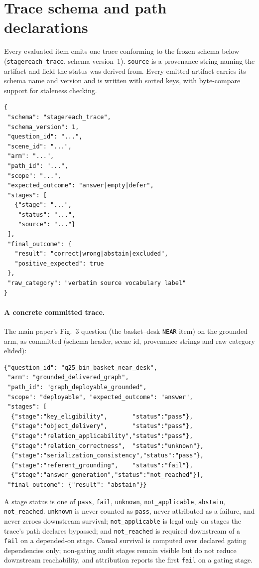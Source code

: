 \section{Trace schema and path declarations}
\label{ssec:schema}

Every evaluated item emits one trace conforming to the frozen schema below
(\texttt{stagereach\_trace}, schema version~1). \texttt{source} is a
provenance string naming the artifact and field the status was derived from.
Every emitted artifact carries its schema name and version and is written
with sorted keys, with byte-compare support for staleness checking.

\begin{center}
\footnotesize
\begin{verbatim}
{
 "schema": "stagereach_trace",
 "schema_version": 1,
 "question_id": "...",
 "scene_id": "...",
 "arm": "...",
 "path_id": "...",
 "scope": "...",
 "expected_outcome": "answer|empty|defer",
 "stages": [
   {"stage": "...",
    "status": "...",
    "source": "..."}
 ],
 "final_outcome": {
   "result": "correct|wrong|abstain|excluded",
   "positive_expected": true
 },
 "raw_category": "verbatim source vocabulary label"
}
\end{verbatim}
\end{center}

\paragraph{A concrete committed trace.} The main paper's Fig.~3 question
(the basket--desk \texttt{NEAR} item) on the grounded arm, as committed
(schema header, scene id, provenance strings and raw category elided):
{\scriptsize
\begin{verbatim}
{"question_id": "q25_bin_basket_near_desk",
 "arm": "grounded_delivered_graph",
 "path_id": "graph_deployable_grounded",
 "scope": "deployable", "expected_outcome": "answer",
 "stages": [
  {"stage":"key_eligibility",       "status":"pass"},
  {"stage":"object_delivery",       "status":"pass"},
  {"stage":"relation_applicability","status":"pass"},
  {"stage":"relation_correctness",  "status":"unknown"},
  {"stage":"serialization_consistency","status":"pass"},
  {"stage":"referent_grounding",    "status":"fail"},
  {"stage":"answer_generation","status":"not_reached"}],
 "final_outcome": {"result": "abstain"}}
\end{verbatim}}

A stage status is one of \texttt{pass}, \texttt{fail}, \texttt{unknown},
\texttt{not\_applicable}, \texttt{abstain}, \texttt{not\_reached}.
\texttt{unknown} is never counted as \texttt{pass}, never attributed as a
failure, and never zeroes downstream survival; \texttt{not\_applicable} is
legal only on stages the trace's path declares bypassed; and
\texttt{not\_reached} is required downstream of a \texttt{fail} on a
depended-on stage. Causal survival is computed over declared gating
dependencies only; non-gating audit stages remain visible but do not reduce
downstream reachability, and attribution reports the first \texttt{fail} on
a gating stage.

